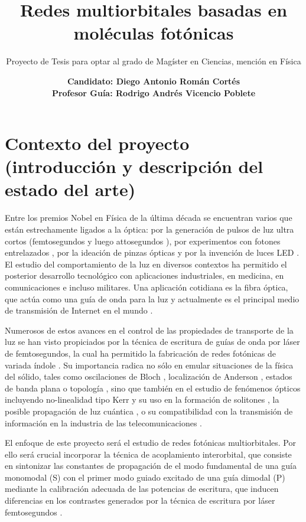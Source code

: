 \documentclass{article}
\date{\textbf{Candidato: Diego Antonio Román Cortés\\ Profesor Guía: Rodrigo Andrés Vicencio Poblete}}
\author{Proyecto de Tesis para optar al grado de Magíster en Ciencias, mención en Física}
\title{Redes multiorbitales basadas en moléculas fotónicas}
\begin{document}
 \maketitle

\section{Contexto del proyecto (introducción y descripción del estado del arte)}

Entre los premios Nobel en Física de la última década \cite{nobel} se encuentran varios que están estrechamente ligados a la óptica: por la generación de pulsos de luz ultra cortos (femtosegundos \cite{femto1} y luego attosegundos \cite{atto1, atto2, atto3}), por experimentos con fotones entrelazados \cite{photons1, photons2, photons3}, por la ideación de pinzas ópticas \cite{opticaltweezers} y por la invención de luces LED \cite{led1, led2, led3}. El estudio del comportamiento de la luz en diversos contextos ha permitido el posterior desarrollo tecnológico con aplicaciones industriales, en medicina, en comunicaciones e incluso militares. Una aplicación cotidiana es la fibra óptica, que actúa como una guía de onda para la luz y actualmente es el principal medio de transmisión de Internet en el mundo \cite{fibra2, fibra}. 
	
	Numerosos de estos avances en el control de las propiedades de transporte de la luz se han visto propiciados por la técnica de escritura de guías de onda por láser de femtosegundos, la cual ha permitido la fabricación de redes fotónicas de variada índole \cite{femto, bics, lieb1, lieb2, artificialFB, FBdynamics, strain, dendritas, splitters}. Su importancia radica no sólo en emular situaciones de la física del sólido, tales como oscilaciones de Bloch \cite{BlochOsci}, localización de Anderson \cite{Anderson}, estados de banda plana \cite{lieb1, lieb2, artificialFB, FBdynamics} o topología \cite{obstopo, obsfloquet, topo1dphoto,toporusos}, sino que también en el estudio de fenómenos ópticos incluyendo no-linealidad tipo Kerr y su uso en la formación de solitones \cite{discretesolitons}, la posible propagación de luz cuántica \cite{qed, squeezed, topoquantum}, o su compatibilidad con la transmisión de información en la industria de las telecomunicaciones \cite{telecom}.
	
	El enfoque de este proyecto será el estudio de redes fotónicas multiorbitales. Por ello será crucial incorporar la técnica de acoplamiento interorbital, que consiste en sintonizar las constantes de propagación de el modo fundamental de una guía monomodal (S) con el primer modo guiado excitado de una guía dimodal (P) mediante la calibración adecuada de las potencias de escritura, que inducen diferencias en los contrastes generados por la técnica de escritura por láser femtosegundos \cite{interorbital}.
	
\end{document}
